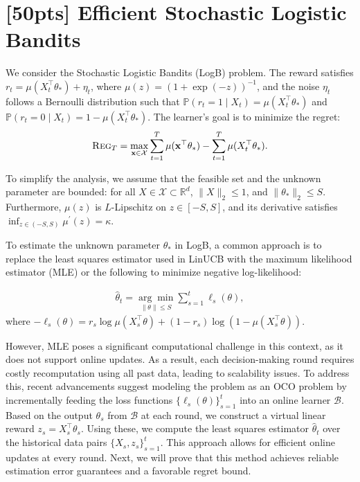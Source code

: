 \documentclass[a4paper]{article}
\numberwithin{equation}{section}
\theoremstyle{definition}
\theoremstyle{definition}
\def \reg {\textsc{Reg}}
\begin{document}
\section{[50pts] Efficient Stochastic Logistic Bandits}
\label{sec:TPBCO}
We consider the Stochastic Logistic Bandits (LogB) problem. The reward satisfies 
$r_t = \mu(X_t^{\top} \theta_*) + \eta_t$, where $\mu(z) = (1 + \exp(-z))^{-1}$, and the noise $\eta_t$ follows a Bernoulli distribution such that $\mathbb{P}(r_t = 1 \mid X_t) = \mu(X_t^{\top} \theta_*)$ and $\mathbb{P}(r_t = 0 \mid X_t) = 1 - \mu(X_t^{\top} \theta_*)$. The learner's goal is to minimize the regret:
\begin{equation*}
  \reg_T=\max _{\mathbf{x} \in \mathcal{X}}\sum_{t=1}^T  \mu(\mathbf{x}^{\top} \theta_*)-\sum_{t=1}^T \mu(X_t^{\top} \theta_*).
\end{equation*}

To simplify the analysis, we assume that the feasible set and the unknown parameter are bounded: for all $X \in \mathcal{X} \subset \mathbb{R}^d$, $\|X\|_2 \leq 1$, and $\|\theta_*\|_2 \leq S$. Furthermore, $\mu(z)$ is $L$-Lipschitz on $z\in[-S, S]$, and its derivative satisfies $\inf_{z \in (-S, S)} \mu^\prime(z) = \kappa$. 

To estimate the unknown parameter $\theta_*$ in LogB, a common approach is to replace the least squares estimator used in LinUCB with the maximum likelihood estimator (MLE) or the following to minimize negative log-likelihood:
\begin{tcolorbox}[top=-1pt]
  \begin{align*}
    \widehat{\theta}_t=\underset{\|\theta\|\leq S}{\arg \min } \sum_{s=1}^t\ell_s(\theta),
  \end{align*}
  where $-\ell_s(\theta) = r_s \log \mu\left(X_s^{\top} \theta\right)+\left(1-r_s\right) \log \left(1-\mu\left(X_s^{\top} \theta\right)\right)$.
\end{tcolorbox}
However, MLE poses a significant computational challenge in this context, as it does not support online updates. As a result, each decision-making round requires costly recomputation using all past data, leading to scalability issues. To address this, recent advancements suggest modeling the problem as an OCO problem by incrementally feeding the loss functions $\{\ell_s(\theta)\}_{s=1}^t$ into an online learner $\mathcal{B}$. Based on the output $\theta_s$ from $\mathcal{B}$ at each round, we construct a virtual linear reward $z_s = X_s^\top \theta_s$. Using these, we compute the least squares estimator $\widehat{\theta}_t$ over the historical data pairs 
$\{X_s, z_s\}_{s=1}^t$. This approach allows for efficient online updates at every round. Next, we will prove that this method achieves reliable estimation error guarantees and a favorable regret bound.
\end{document}
